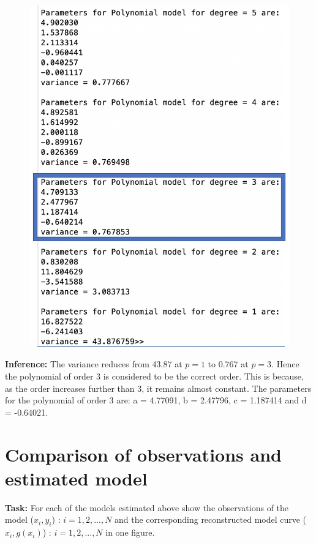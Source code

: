 \begin{figure}[H]
\endminipage\hfill
{}%
  \includegraphics[width=\linewidth]{ass4_2.png}
\endminipage
\end{figure}

\noindent \textbf{Inference:} The variance reduces from 43.87 at $p = 1$ to 0.767 at $p = 3.$ Hence the polynomial of order 3 is considered to be the correct order. This is because, as the order increases further than 3, it remains almost constant. The parameters for the polynomial of order 3 are:  a = 4.77091, b = 2.47796, c = 1.187414 and d = -0.64021.

\section{Comparison of observations and estimated model}  \label{Comparison of observations and estimated model}
\noindent \textbf{Task:} For each of the models estimated above show the observations of the model ($x_i, y_i$) : $i = 1,2,...,N$ and the corresponding reconstructed model curve ($x_i, g(x_i)$) : $i = 1,2,...,N$ in one figure.
 
